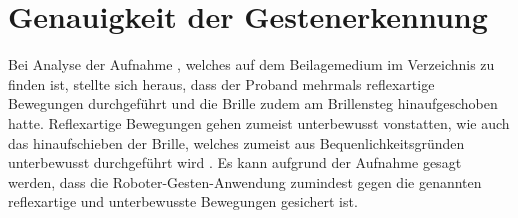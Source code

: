 \section{Genauigkeit der Gestenerkennung}
Bei Analyse der Aufnahme , welches auf dem Beilagemedium im Verzeichnis  zu finden ist, stellte sich heraus, dass der Proband mehrmals reflexartige Bewegungen durchgeführt und die Brille zudem am Brillensteg hinaufgeschoben hatte. Reflexartige Bewegungen gehen zumeist unterbewusst vonstatten, wie auch das hinaufschieben der Brille, welches zumeist aus Bequenlichkeitsgründen unterbewusst durchgeführt wird \cite{matschnig_glossar_nodate}. Es kann aufgrund der Aufnahme gesagt werden, dass die Roboter-Gesten-Anwendung zumindest gegen die genannten reflexartige und unterbewusste Bewegungen gesichert ist.
